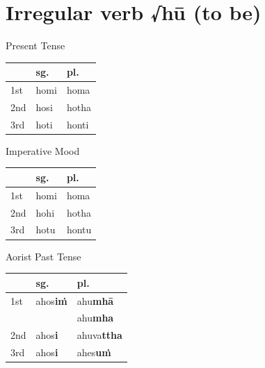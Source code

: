 \documentclass[a4paper]{memoir}
\begin{document}
\section{Irregular verb √hū (to be)}
\label{sec:orgd89c620}

{\centering\par
\begin{multicols}{3}

Present Tense

\begin{center}
\begin{tabular}{lll}
 & \textbf{sg.} & \textbf{pl.}\\[0pt]
\hline
1st & homi & homa\\[0pt]
2nd & hosi & hotha\\[0pt]
3rd & hoti & honti\\[0pt]
\end{tabular}
\end{center}

\columnbreak

Imperative Mood

\begin{center}
\begin{tabular}{lll}
 & \textbf{sg.} & \textbf{pl.}\\[0pt]
\hline
1st & homi & homa\\[0pt]
2nd & hohi & hotha\\[0pt]
3rd & hotu & hontu\\[0pt]
\end{tabular}
\end{center}

\columnbreak

Aorist Past Tense

\begin{center}
\begin{tabular}{lll}
 & \textbf{sg.} & \textbf{pl.}\\[0pt]
\hline
1st & ahos\textbf{iṁ} & ahu\textbf{mhā}\\[0pt]
 &  & ahu\textbf{mha}\\[0pt]
2nd & ahos\textbf{i} & ahuva\textbf{ttha}\\[0pt]
3rd & ahos\textbf{i} & ahes\textbf{uṁ}\\[0pt]
\end{tabular}
\end{center}

\end{multicols}
\par}
\end{document}
